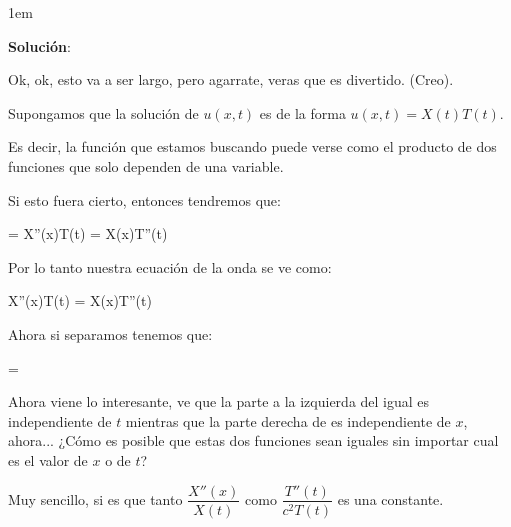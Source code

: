 \documentclass[12pt, fleqn]{report}                             %
\newenvironment{SmallIndentation}[1][0.75em]                    %
    {\begin{adjustwidth}{#1}{}\begin{footnotesize}}                 %
    {\end{footnotesize}\end{adjustwidth}}                           %
\DeclareMathOperator \Space {\quad}                             %
\newenvironment{MultiLineEquation*}[1]                          %
        {\begin{equation*}\begin{alignedat}{#1}}                    %
        {\end{alignedat}\end{equation*}}                            %
\newcommand \UpperDerivate[3]                                   %
        {\dfrac{d^{#3} \; #1}{d#2^{#3}}}                            %
\newcommand \UpperPartial[3]                                    %
        {\dfrac{\partial^{#3} \; #1}{\partial#2^{#3}}}              %
\begin{document}
                \begin{SmallIndentation}[1em]
                    \textbf{Solución}:
                    
                    Ok, ok, esto va a ser largo, pero agarrate, veras que es
                    divertido. (Creo).

                    Supongamos que la solución de $u(x,t)$ es de la forma
                    $u(x,t) = X(t)T(t)$.

                    Es decir, la función que estamos buscando puede verse
                    como el producto de dos funciones que solo dependen de 
                    una variable.

                    Si esto fuera cierto, entonces tendremos que:
                    \begin{MultiLineEquation*}{3}
                        \UpperPartial{u(x, t)}{x}{2} = X''(x)T(t)
                        \Space\Space
                        \Space\Space
                        \UpperPartial{u(x, t)}{t}{2} = X(x)T''(t)
                    \end{MultiLineEquation*}

                    Por lo tanto nuestra ecuación de la onda se ve como:
                    \begin{MultiLineEquation*}{3}
                        X''(x)T(t) =  \; X(x)T''(t)
                    \end{MultiLineEquation*}
                        

                    Ahora si separamos tenemos que:
                    \begin{MultiLineEquation*}{3}
                         = 
                    \end{MultiLineEquation*}


                    \clearpage

                    Ahora viene lo interesante, ve que la parte a la izquierda
                    del igual es independiente de $t$ mientras que la parte
                    derecha de es independiente de $x$, ahora... ¿Cómo es 
                    posible que estas dos funciones sean iguales sin importar
                    cual es el valor de $x$ o de $t$?

                    Muy sencillo, si es que tanto $\dfrac{X''(x)}{X(t)}$ como
                    $\dfrac{T''(t)}{c^2 T(t)}$ es una constante.


\end{SmallIndentation}
\end{document}
